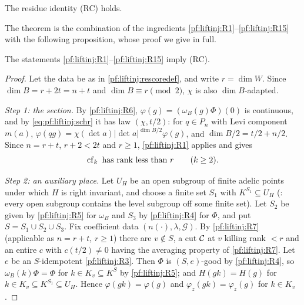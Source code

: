 \begin{theorem}\label{pf:liftinj:rescore}
The residue identity (RC) holds.
\end{theorem}

The theorem is the combination of the ingredients \ref{pf:liftinj:R1}--\ref{pf:liftinj:R15} with the following
proposition, whose proof we give in full.

\begin{proposition}\label{pf:liftinj:rescoreassembly}
The statements \ref{pf:liftinj:R1}--\ref{pf:liftinj:R15} imply (RC).
\end{proposition}

\begin{proof}
Let the data be as in \cref{pf:liftinj:rescoredef}, and write $r=\dim W$. Since $\dim B=r+2t=n+t$ and $\dim B\equiv r\pmod 2$, $\chi$ is also
$\dim B$-adapted.

\emph{Step 1: the section.} By \ref{pf:liftinj:R6}, $\varphi(g)=(\omega_B(g)\Phi)(0)$ is continuous, and by \eqref{eq:pf:liftinj:schr} it has law
$(\chi,t/2)$: for $q\in P_n$ with Levi component $m(a)$, $\varphi(qg)=\chi(\det a)|\det a|^{\dim B/2}\varphi(g)$, and $\dim B/2=t/2+n/2$. Since
$n=r+t$, $r+2<2t$ and $r\ge1$, \ref{pf:liftinj:R1} applies and gives
\begin{equation}\label{eq:pf:liftinj:P2}
\operatorname{cf}_k\ \text{has rank less than } r\qquad(k\ge2).
\end{equation}

\emph{Step 2: an auxiliary place.} Let $U_H$ be an open subgroup of finite adelic points under which $H$ is right invariant, and choose a finite set
$S_1$ with $K^{S_1}\subseteq U_H$ (: every open subgroup contains the level subgroup off some
finite set). Let $S_2$ be given by \ref{pf:liftinj:R5} for $\omega_B$ and $S_3$ by \ref{pf:liftinj:R4} for $\Phi$, and put $S=S_1\cup S_2\cup S_3$.
Fix coefficient data $(n(\cdot),\lambda,\mathcal G)$. By \ref{pf:liftinj:R7} (applicable as $n=r+t$, $r\ge1$) there are $v\notin S$, a cut
$\mathcal{C}$ at $v$ killing rank $<r$ and an entire $c$ with $c(t/2)\ne0$ having the averaging property of \ref{pf:liftinj:R7}. Let $e$ be an
$S$-idempotent \ref{pf:liftinj:R3}. Then $\Phi$ is $(S,e)$-good by \ref{pf:liftinj:R4}, so $\omega_B(k)\Phi=\Phi$ for $k\in K_v\subseteq K^S$ by
\ref{pf:liftinj:R5}; and $H(gk)=H(g)$ for $k\in K_v\subseteq K^{S_1}\subseteq U_H$. Hence $\varphi(gk)=\varphi(g)$ and $\varphi_z(gk)=\varphi_z(g)$
for $k\in K_v$.


\end{proof}
